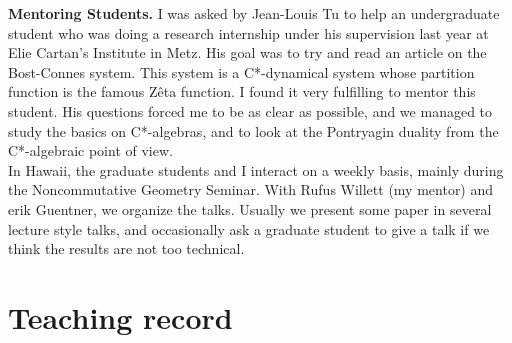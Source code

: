 \documentclass[a4paper]{article}
\begin{document}
\textbf{Mentoring Students.} I was asked by Jean-Louis Tu to help an undergraduate student who was doing a research internship under his supervision last year at Elie Cartan’s Institute in Metz. His goal was to try and read an article on the Bost-Connes system. This system is a C*-dynamical system whose partition function is the famous Zêta function. I found it very fulfilling to mentor this student. His questions forced me to be as clear as possible, and we managed to study the basics on C*-algebras, and to look at the Pontryagin duality from the C*-algebraic point of view. \\

In Hawaii, the graduate students and I interact on a weekly basis, mainly during the Noncommutative Geometry Seminar. With Rufus Willett (my mentor) and erik Guentner, we organize the talks. Usually we present some paper in several lecture style talks, and occasionally ask a graduate student to give a talk if we think the results are not too technical.\\

\section{Teaching record}
\end{document}
